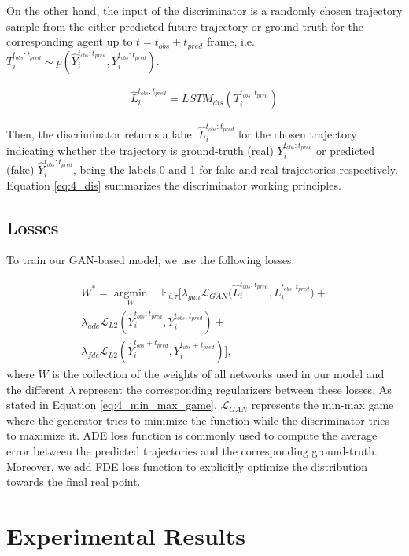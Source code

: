 On the other hand, the input of the discriminator is a randomly chosen trajectory sample from the either predicted future trajectory or ground-truth for the corresponding agent up to $t = t_{obs} + t_{pred}$ frame, i.e.  $T_i^{t_{obs}:t_{pred}}\sim p(\hat{Y}_i^{t_{obs}:t_{pred}},Y_i^{t_{obs}:t_{pred}})$.

\begin{eqnarray}
	\label{eq:4_dis}
	\hat{L}_{i}^{t_{obs}:t_{pred}} = LSTM_{dis}(T_i^{t_{obs}:t_{pred}})
\end{eqnarray}

Then, the discriminator returns a label $\hat{L}_{i}^{t_{obs}:t_{pred}}$ for the chosen trajectory indicating whether the trajectory is ground-truth (real) $Y_i^{t_{obs}:t_{pred}}$ or predicted (fake) $\hat{Y}_i^{t_{obs}:t_{pred}}$, being the labels 0 and 1 for fake and real trajectories respectively. Equation \ref{eq:4_dis} summarizes the discriminator working principles. 

\subsection{Losses}
\label{subsec:5_losses}

To train our \ac{GAN}-based model, we use the following losses:

\begin{eqnarray}
	\label{eq:obj}
	W^* =\operatorname*{argmin}_W \quad\mathbb{E}_{i,\tau}[\lambda_{gan} \mathcal{L}_{GAN}\big(\hat{L}_{i}^{t_{obs}:t_{pred}}, L_{i}^{t_{obs}:t_{pred}} \big)+ \nonumber\\
	\lambda_{ade} \mathcal{L}_{L2}(\hat{Y}_i^{t_{obs}:t_{pred}},Y_i^{t_{obs}:t_{pred}})+ \nonumber\\
	\lambda_{fde} \mathcal{L}_{L2}(\hat{Y}_i^{t_{obs}+t_{pred}},Y_i^{t_{obs}+t_{pred}})],
\end{eqnarray}
%
where $W$ is the collection of the weights of all networks used in our model and the different $\lambda$ represent the corresponding regularizers between these losses. As stated in Equation \ref{eq:4_min_max_game}, $\mathcal{L}_{GAN}$ represents the min-max game where the generator tries to minimize the function while the discriminator tries to maximize it. ADE loss function is commonly used to compute the average error between the predicted trajectories and the corresponding ground-truth. Moreover, we add FDE loss function to explicitly optimize the distribution towards the final real point.

\section{Experimental Results}
\label{section:experimental_results}

